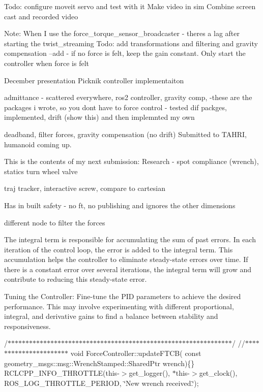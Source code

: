Todo\+: configure moveit servo and test with it Make video in sim Combine screen cast and recorded video

Note\+: When I use the force\+\_\+torque\+\_\+sensor\+\_\+broadcaster -\/ there\textquotesingle{}s a lag after starting the twist\+\_\+streaming Todo\+: add transformations and filtering and gravity compensation --add -\/ if no force is felt, keep the gain constant. Only start the controller when force is felt

December presentation Picknik controller implementaiton
\begin{DoxyItemize}
\item admittance -\/ scattered everywhere, ros2 controller, gravity comp, -\/these are the packages i wrote, so you don\textquotesingle{}t have to force control -\/ tested dif packges, implemented, drift (show this) and then implemnted my own
\item deadband, filter forces, gravity compensation (no drift) Submitted to TAHRI, humanoid coming up.
\end{DoxyItemize}

This is the contents of my next submission\+: Research -\/ spot compliance (wrench), statics turn wheel valve
\begin{DoxyItemize}
\item traj tracker, interactive screw, compare to cartesian
\end{DoxyItemize}

Has in built safety -\/ no ft, no publishing and ignores the other dimensions

different node to filter the forces

The integral term is responsible for accumulating the sum of past errors. In each iteration of the control loop, the error is added to the integral term. This accumulation helps the controller to eliminate steady-\/state errors over time. If there is a constant error over several iterations, the integral term will grow and contribute to reducing this steady-\/state error.

Tuning the Controller\+: Fine-\/tune the PID parameters to achieve the desired performance. This may involve experimenting with different proportional, integral, and derivative gains to find a balance between stability and responsiveness.

/$\ast$$\ast$$\ast$$\ast$$\ast$$\ast$$\ast$$\ast$$\ast$$\ast$$\ast$$\ast$$\ast$$\ast$$\ast$$\ast$$\ast$$\ast$$\ast$$\ast$$\ast$$\ast$$\ast$$\ast$$\ast$$\ast$$\ast$$\ast$$\ast$$\ast$$\ast$$\ast$$\ast$$\ast$$\ast$$\ast$$\ast$$\ast$$\ast$$\ast$$\ast$$\ast$$\ast$$\ast$$\ast$$\ast$$\ast$$\ast$$\ast$$\ast$$\ast$$\ast$$\ast$$\ast$$\ast$$\ast$$\ast$$\ast$$\ast$$\ast$$\ast$$\ast$$\ast$/ //$\ast$$\ast$$\ast$$\ast$$\ast$$\ast$$\ast$$\ast$$\ast$$\ast$$\ast$$\ast$$\ast$$\ast$$\ast$$\ast$$\ast$$\ast$$\ast$$\ast$$\ast$$\ast$ void Force\+Controller\+::update\+FTCB( const geometry\+\_\+msgs\+::msg\+::\+Wrench\+Stamped\+::\+Shared\+Ptr wrench)\{\} RCLCPP\+\_\+\+INFO\+\_\+\+THROTTLE(this-\/$>$get\+\_\+logger(), $\ast$this-\/$>$get\+\_\+clock(), ROS\+\_\+\+LOG\+\_\+\+THROTTLE\+\_\+\+PERIOD, \char`\"{}\+New wrench received.\char`\"{});

